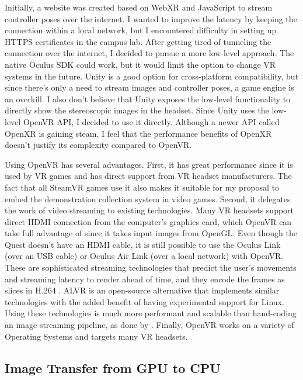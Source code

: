 Initially, a website was created based on WebXR and JavaScript to stream controller poses over the internet. I wanted to improve the latency by keeping the connection within a local network, but I encountered difficulty in setting up HTTPS certificates in the campus lab. After getting tired of tunneling the connection over the internet, I decided to pursue a more low-level approach. 
The native Oculus SDK could work, but it would limit the option to change VR systems in the future. Unity is a good option for cross-platform compatibility, but since there's only a need to stream images and controller poses, a game engine is an overkill. I also don't believe that Unity exposes the low-level functionality to directly show the stereoscopic images in the headset. Since Unity uses the low-level OpenVR API, I decided to use it directly. Although a newer API called OpenXR is gaining steam, I feel that the performance benefits of OpenXR doesn't justify its complexity compared to OpenVR. 

Using OpenVR has several advantages. First, it has great performance since it is used by VR games and has direct support from VR headset manufacturers. The fact that all SteamVR games use it also makes it suitable for my proposal to embed the demonstration collection system in video games. Second, it delegates the work of video streaming to existing technologies. Many VR headsets support direct HDMI connection from the computer's graphics card, which OpenVR can take full advantage of since it takes input images from OpenGL. Even though the Quest doesn't have an HDMI cable, it is still possible to use the Oculus Link (over an USB cable) or Oculus Air Link (over a local network) with OpenVR. These are sophisticated streaming technologies that predict the user's movements and streaming latency to render ahead of time, and they encode the frames as slices in H.264 \cite{air-link}. ALVR is an open-source alternative that implements similar technologies with the added benefit of having experimental support for Linux. Using these technologies is much more performant and scalable than hand-coding an image streaming pipeline, as done by \cite{arunachalam2022holodex}. Finally, OpenVR works on a variety of Operating Systems and targets many VR headsets. 

\subsection{Image Transfer from GPU to CPU}

